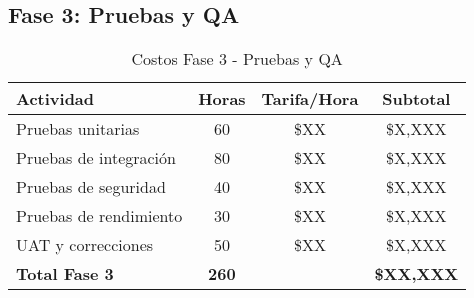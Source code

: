\subsection{Fase 3: Pruebas y QA}
\begin{table}[h!]
\centering
\begin{tabular}{|l|c|c|c|}
\hline
\textbf{Actividad} & \textbf{Horas} & \textbf{Tarifa/Hora} & \textbf{Subtotal} \\
\hline
Pruebas unitarias & 60 & \$XX & \$X,XXX \\
Pruebas de integración & 80 & \$XX & \$X,XXX \\
Pruebas de seguridad & 40 & \$XX & \$X,XXX \\
Pruebas de rendimiento & 30 & \$XX & \$X,XXX \\
UAT y correcciones & 50 & \$XX & \$X,XXX \\
\hline
\textbf{Total Fase 3} & \textbf{260} & & \textbf{\$XX,XXX} \\
\hline
\end{tabular}
\caption{Costos Fase 3 - Pruebas y QA}
\end{table}